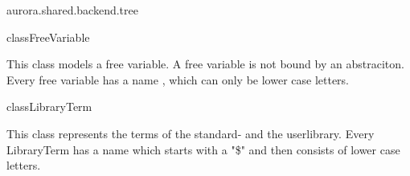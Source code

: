 \begin{texdocpackage}{aurora.shared.backend.tree}
\begin{texdocclass}{class}{FreeVariable}
\label{texdoclet:aurora.shared.backend.tree.FreeVariable}
\begin{texdocclassintro}
This class models a free variable. A free variable is not bound by an abstraciton.
 Every free variable has a name , which can only be lower case letters.\end{texdocclassintro}
\begin{texdocclassconstructors}
\end{texdocclassconstructors}
\begin{texdocclassmethods}
\end{texdocclassmethods}
\end{texdocclass}


\begin{texdocclass}{class}{LibraryTerm}
\label{texdoclet:aurora.shared.backend.tree.LibraryTerm}
\begin{texdocclassintro}
This class represents the terms of the standard- and the userlibrary.
 Every LibraryTerm has a name which starts with a "\$" and then consists of lower case letters.\end{texdocclassintro}
\begin{texdocclassconstructors}
\end{texdocclassconstructors}
\begin{texdocclassmethods}
\end{texdocclassmethods}
\end{texdocclass}



\end{texdocpackage}
